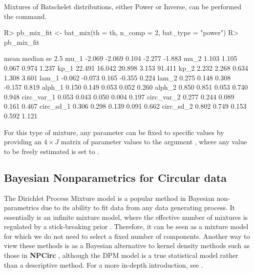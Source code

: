 \documentclass{article}
\newcommand{\code}[1]{\texttt{\detokenize{#1}}}
\newcommand{\pkg}[1]{\textbf{#1}}
\newenvironment{CodeChunk}{}{}
\begin{document}
Mixtures of Batschelet distributions, either Power or Inverse, can be
performed the \code{bat_mix} command.

\begin{CodeChunk}
	
	\begin{CodeInput}
		R> pb_mix_fit <- bat_mix(th = th, n_comp = 2, bat_type = "power")
		R> pb_mix_fit
	\end{CodeInput}
	
	\begin{CodeOutput}
		mean median     se   2.5%
		mu_1       -2.069 -2.069  0.104 -2.277 -1.883
		mu_2        1.103  1.105  0.067  0.974  1.237
		kp_1       22.491 16.042 20.898  3.153 91.411
		kp_2        2.232  2.268  0.634  1.308  3.601
		lam_1      -0.062 -0.073  0.165 -0.355  0.224
		lam_2       0.275  0.148  0.308 -0.157  0.819
		alph_1      0.150  0.149  0.053  0.052  0.260
		alph_2      0.850  0.851  0.053  0.740  0.948
		circ_var_1  0.053  0.043  0.050  0.004  0.197
		circ_var_2  0.277  0.244  0.089  0.161  0.467
		circ_sd_1   0.306  0.298  0.139  0.091  0.662
		circ_sd_2   0.802  0.749  0.153  0.592  1.121
	\end{CodeOutput}
\end{CodeChunk}

For this type of mixture, any parameter can be fixed to specific values
by providing an \(4 \times J\) matrix of parameter values to the
argument \code{fixed_pmat}, where any value to be freely estimated is
set to \code{NA}.

\hypertarget{bayesian-nonparametrics-for-circular-data}{%
	\subsection{Bayesian Nonparametrics for Circular
		data}\label{bayesian-nonparametrics-for-circular-data}}

\label{sec:dpmjss}

The Dirichlet Process Mixture model is a popular method in Bayesian
non-parametrics due to its ability to fit data from any data generating
process. It essentially is an infinite mixture model, where the
effective number of mixtures is regulated by a stick-breaking prior
\citep{ishwaran2001gibbs}. Therefore, it can be seen as a mixture model
for which we do not need to select a fixed number of components. Another
way to view these methods is as a Bayesian alternative to kernel density
methods such as those in \pkg{NPCirc} \citep{JSSv061i09}, although the
DPM model is a true statistical model rather than a descriptive method.
For a more in-depth introduction, see
\citet[ch. 23]{gelman2003bayesian}.
\end{document}

